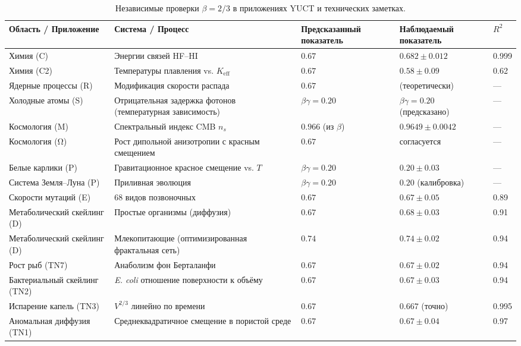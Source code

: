 \documentclass[11pt,a4paper]{article}
\newcommand{\betaf}{\beta}
\begin{document}
\begin{multicols}{2}
		\begin{table}[htbp]
			\centering
			\caption{Независимые проверки \(\betaf = 2/3\) в приложениях YUCT и технических заметках.}
			\label{tab:full}
			\footnotesize
			\begin{tabular}{p{3.5cm}p{5.0cm}p{2.1cm}p{3.5cm}p{1.4cm}}
				\toprule
				\textbf{Область / Приложение} & \textbf{Система / Процесс} & \textbf{Предсказанный показатель} & \textbf{Наблюдаемый показатель} & \(R^2\) \\
				\midrule
				Химия (C) & Энергии связей HF–HI & \(0.67\) & \(0.682 \pm 0.012\) & 0.999 \\
				Химия (C2) & Температуры плавления vs. \(K_{\mathrm{eff}}\) & \(0.67\) & \(0.58 \pm 0.09\) & 0.62 \\
				Ядерные процессы (R) & Модификация скорости распада & \(0.67\) & (теоретически) & — \\
				Холодные атомы (S) & Отрицательная задержка фотонов (температурная зависимость) & \(\beta\gamma = 0.20\) & \(\beta\gamma = 0.20\) (предсказано) & — \\
				Космология (M) & Спектральный индекс CMB \(n_s\) & \(0.966\) (из \(\beta\)) & \(0.9649 \pm 0.0042\) & — \\
				Космология (Ω) & Рост дипольной анизотропии с красным смещением & \(0.67\) & согласуется & — \\
				Белые карлики (P) & Гравитационное красное смещение vs. \(T\) & \(\beta\gamma = 0.20\) & \(0.20 \pm 0.03\) & — \\
				Система Земля–Луна (P) & Приливная эволюция & \(\beta\gamma = 0.20\) & \(0.20\) (калибровка) & — \\
				Скорости мутаций (E) & 68 видов позвоночных & \(0.67\) & \(0.67 \pm 0.05\) & 0.89 \\
				Метаболический скейлинг (D) & Простые организмы (диффузия) & \(0.67\) & \(0.68 \pm 0.03\) & 0.91 \\
				Метаболический скейлинг (D) & Млекопитающие (оптимизированная фрактальная сеть) & \(0.74\) & \(0.74 \pm 0.02\) & 0.94 \\
				Рост рыб (TN7) & Анаболизм фон Берталанфи & \(0.67\) & \(0.67 \pm 0.02\) & 0.94 \\
				Бактериальный скейлинг (TN2) & \emph{E. coli} отношение поверхности к объёму & \(0.67\) & \(0.67 \pm 0.03\) & 0.94 \\
				Испарение капель (TN3) & \(V^{2/3}\) линейно по времени & \(0.67\) & \(0.667\) (точно) & 0.995 \\
				Аномальная диффузия (TN1) & Среднеквадратичное смещение в пористой среде & \(0.67\) & \(0.67 \pm 0.04\) & 0.97 \\

\end{tabular}
\end{table}
\end{multicols}
\end{document}
